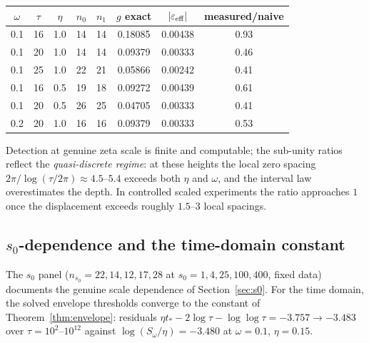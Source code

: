 \documentclass[11pt]{amsart}
\theoremstyle{definition}
\theoremstyle{remark}
\newcommand{\eps}{\varepsilon}
\begin{document}
\begin{center}
\begin{tabular}{cccccccc}
\toprule
$\omega$ & $\tau$ & $\eta$ & $n_0$ & $n_1$ & $g$ exact & $|\eps_{\rm eff}|$
& measured/naive \\
\midrule
0.1 & 16 & 1.0 & 14 & 14 & 0.18085 & 0.00438 & 0.93 \\
0.1 & 20 & 1.0 & 14 & 14 & 0.09379 & 0.00333 & 0.46 \\
0.1 & 25 & 1.0 & 22 & 21 & 0.05866 & 0.00242 & 0.41 \\
0.1 & 16 & 0.5 & 19 & 18 & 0.09272 & 0.00439 & 0.61 \\
0.1 & 20 & 0.5 & 26 & 25 & 0.04705 & 0.00333 & 0.41 \\
0.2 & 20 & 1.0 & 16 & 16 & 0.09379 & 0.00333 & 0.53 \\
\bottomrule
\end{tabular}
\end{center}

\noindent
Detection at genuine zeta scale is finite and computable; the sub-unity
ratios reflect the \emph{quasi-discrete regime}: at these heights the local
zero spacing $2\pi/\log(\tau/2\pi)\approx4.5$--$5.4$ exceeds both $\eta$ and
$\omega$, and the interval law overestimates the depth. In controlled
scaled experiments the ratio approaches $1$ once the displacement exceeds
roughly $1.5$--$3$ local spacings.

\subsection{$s_0$-dependence and the time-domain constant}
The $s_0$ panel ($n_{s_0}=22,14,12,17,28$ at $s_0=1,4,25,100,400$, fixed
data) documents the genuine scale dependence of
Section~\ref{sec:s0}. For the time domain, the solved envelope thresholds
converge to the constant of Theorem~\ref{thm:envelope}:
residuals $\eta t_*-2\log\tau-\log\log\tau=-3.757\to-3.483$ over
$\tau=10^2$--$10^{12}$ against $\log(S_\omega/\eta)=-3.480$ at
$\omega=0.1$, $\eta=0.15$.

\end{document}

